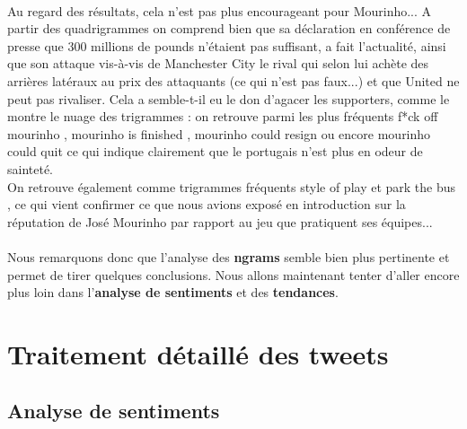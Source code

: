\documentclass[14pt, openany]{article}
\begin{document}
\paragraph{}
Au regard des résultats, cela n'est pas plus encourageant pour Mourinho... A partir des quadrigrammes on comprend bien que sa déclaration en conférence de presse que 300 millions de pounds n'étaient pas suffisant, a fait l'actualité, ainsi que son attaque vis-à-vis de Manchester City le rival qui selon lui \og achète des arrières latéraux au prix des attaquants \fg{} (ce qui n'est pas faux...) et que United ne peut pas rivaliser. Cela a semble-t-il eu le don d'agacer les supporters, comme le montre le nuage des trigrammes : on retrouve parmi les plus fréquents \og f*ck off mourinho \fg{}, \og mourinho is finished \fg{}, \og mourinho could resign \fg{} ou encore \og mourinho could quit \fg{} ce qui indique clairement que le portugais n'est plus en odeur de sainteté.\\
On retrouve également comme trigrammes fréquents \og style of play \fg{} et \og park the bus \fg{}, ce qui vient confirmer ce que nous avions exposé en introduction sur la réputation de José Mourinho par rapport au jeu que pratiquent ses équipes...

\paragraph{}
Nous remarquons donc que l'analyse des \textbf{ngrams} semble bien plus pertinente et permet de tirer quelques conclusions. Nous allons maintenant tenter d'aller encore plus loin dans l'\textbf{analyse de sentiments} et des \textbf{tendances}.
\newpage
\section{Traitement détaillé des tweets}
\subsection{Analyse de sentiments}
\end{document}
